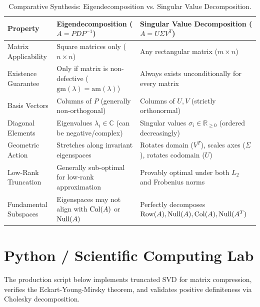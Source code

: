 \begin{table}[htbp]
\centering
\small
\begin{tabularx}{\textwidth}{lXX}
\toprule
\textbf{Property} & \textbf{Eigendecomposition ($A = P D P^{-1}$)} & \textbf{Singular Value Decomposition ($A = U \Sigma V^T$)} \\
\midrule
Matrix Applicability & Square matrices only ($n \times n$) & Any rectangular matrix ($m \times n$) \\
\addlinespace
Existence Guarantee & Only if matrix is non-defective ($\text{gm}(\lambda) = \text{am}(\lambda)$) & Always exists unconditionally for every matrix \\
\addlinespace
Basis Vectors & Columns of $P$ (generally non-orthogonal) & Columns of $U, V$ (strictly orthonormal) \\
\addlinespace
Diagonal Elements & Eigenvalues $\lambda_i \in \mathbb{C}$ (can be negative/complex) & Singular values $\sigma_i \in \mathbb{R}_{\ge 0}$ (ordered decreasingly) \\
\addlinespace
Geometric Action & Stretches along invariant eigenspaces & Rotates domain ($V^T$), scales axes ($\Sigma$), rotates codomain ($U$) \\
\addlinespace
Low-Rank Truncation & Generally sub-optimal for low-rank approximation & Provably optimal under both $L_2$ and Frobenius norms \\
\addlinespace
Fundamental Subspaces & Eigenspaces may not align with $\operatorname{Col}(A)$ or $\operatorname{Null}(A)$ & Perfectly decomposes $\operatorname{Row}(A), \operatorname{Null}(A), \operatorname{Col}(A), \operatorname{Null}(A^T)$ \\
\bottomrule
\end{tabularx}
\caption{Comparative Synthesis: Eigendecomposition vs. Singular Value Decomposition.}
\label{tab:eigen_vs_svd}
\end{table}

\section{Python / Scientific Computing Lab}

The production script below implements truncated SVD for matrix compression, verifies the Eckart-Young-Mirsky theorem, and validates positive definiteness via Cholesky decomposition.

